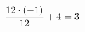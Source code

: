 \documentclass[preview]{standalone}
\begin{document}
\begin{align*}
\special{dvisvgm:raw <g id='unique000'>}\frac{12 \cdot (-1)}{12} + 4 = 3\special{dvisvgm:raw </g>}
\end{align*}
\end{document}
